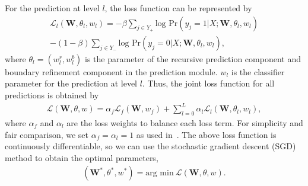 \documentclass[10pt,twocolumn,letterpaper]{article}
\begin{document}
For the prediction at level $l$, the loss function can be represented by
\begin{equation}
  \label{equ:equ5}
\begin{aligned}
  \mathcal{L}_l(\textbf{W},\theta_l,w_l)= - \beta \sum_{j\in Y_{+}} \text{log~Pr}(y_{j}=1|X;\textbf{W},\theta_l,w_l)\\
  -(1-\beta)\sum_{j\in Y_{-}} \text{log~Pr}(y_{j}=0|X;\textbf{W},\theta_l,w_l),
\end{aligned}
\end{equation}
where $\theta_l = (w^r_l,w^{b}_l)$ is the parameter of the recursive prediction component and boundary refinement component in the prediction module.
%
$w_l$ is the classifier parameter for the prediction at level $l$.
Thus, the joint loss function for all predictions is obtained by
\begin{align}
  \mathcal{L}(\textbf{W},\theta,w)= \alpha_f \mathcal{L}_f(\textbf{W},w_f)
  +\sum_{l=0}^{L}\alpha_l\mathcal{L}_l(\textbf{W},\theta_l,w_l),
  \label{equ:equ6}
\end{align}
where $\alpha_f$ and $\alpha_l$ are the loss weights to balance each loss term. For simplicity and fair comparison, we set $\alpha_f=\alpha_l=1$ as used in~\cite{xie2015holistically}.
The above loss function is continuously differentiable, so we can use the stochastic gradient descent (SGD) method to obtain the optimal parameters,
\begin{align}
(\textbf{W}^{*},\theta^{*},w^{*})= \text{arg min}~\mathcal{L}(\textbf{W},\theta,w).
  \label{equ:equ7}
\end{align}
\end{document}
